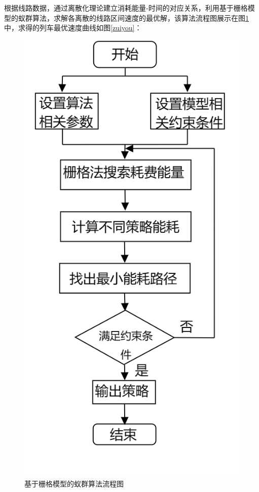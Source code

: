 \documentclass[12pt,a4paper]{nmmcm}
\begin{document}
根据线路数据，通过离散化理论建立消耗能量-时间的对应关系，利用基于栅格模型的蚁群算法，求解各离散的线路区间速度的最优解，该算法流程图展示在图\ref{lct}中，求得的列车最优速度曲线如图\ref{zuiyou}：
\begin{figure}
\centering
\includegraphics[scale=0.3]{figures/diagram-20230513.png}
\caption{基于栅格模型的蚁群算法流程图}\label{lct}
\end{figure}
\end{document}
